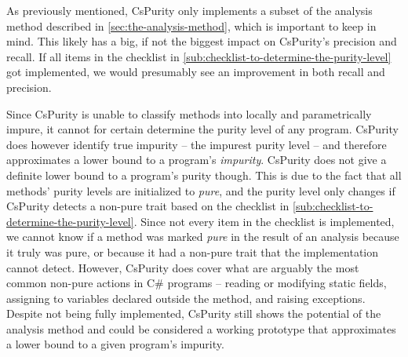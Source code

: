 \documentclass[a4paper,12pt]{article}
\begin{document}
As previously mentioned, CsPurity only implements a subset of the analysis method described in \autoref{sec:the-analysis-method}, which is important to keep in mind. This likely has a big, if not the biggest impact on CsPurity's precision and recall. If all items in the checklist in \autoref{sub:checklist-to-determine-the-purity-level} got implemented, we would presumably see an improvement in both recall and precision.


Since CsPurity is unable to classify methods into locally and parametrically impure, it cannot for certain determine the purity level of any program. CsPurity does however identify true impurity -- the impurest purity level -- and therefore approximates a lower bound to a program's \textit{impurity}. %
CsPurity does not give a definite lower bound to a program's purity though. This is due to the fact that all methods' purity levels are initialized to \textit{pure}, and the purity level only changes if CsPurity detects a non-pure trait based on the checklist in \autoref{sub:checklist-to-determine-the-purity-level}. Since not every item in the checklist is implemented, we cannot know if a method was marked \textit{pure} in the result of an analysis because it truly was pure, or because it had a non-pure trait that the implementation cannot detect. However, CsPurity does cover what are arguably the most common non-pure actions in C\# programs -- reading or modifying static fields, assigning to variables declared outside the method, and raising exceptions. Despite not being fully implemented, CsPurity still shows the potential of the analysis method and could be considered a working prototype that approximates a lower bound to a given program's impurity.
\end{document}
